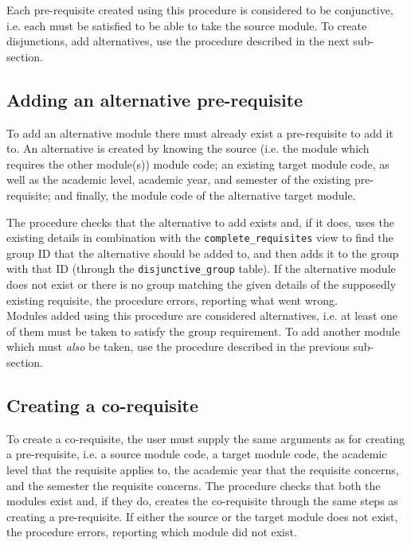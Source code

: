     Each pre-requisite created using this procedure is considered to be
    conjunctive, i.e. each must be satisfied to be able to take the source
    module. To create disjunctions, add alternatives, use the procedure
    described in the next sub-section.
    
    \subsection{Adding an alternative pre-requisite}
    To add an alternative module there must already exist a pre-requisite to add
    it to. An alternative is created by knowing the source (i.e. the module
    which requires the other module(s)) module code; an existing target module
    code, as well as the academic level, academic year, and semester of the
    existing pre-requisite; and finally, the module code of the alternative
    target module.
    
    The procedure checks that the alternative to add exists and, if it does,
    uses the existing details in combination with the
    \texttt{complete\_requisites} view to find the group ID that the alternative
    should be added to, and then adds it to the group with that ID (through the
    \texttt{disjunctive\_group} table). If the alternative module does not exist
    or there is no group matching the given details of the supposedly existing
    requisite, the procedure errors, reporting what went wrong.
    \\
    
    Modules added using this procedure are considered alternatives, i.e. at
    least one of them must be taken to satisfy the group requirement. To add
    another module which must \textit{also} be taken, use the procedure
    described in the previous sub-section.
    
    \subsection{Creating a co-requisite}
    To create a co-requisite, the user must supply the same arguments as for
    creating a pre-requisite, i.e. a source module code, a target module code,
    the academic level that the requisite applies to, the academic year that the
    requisite concerns, and the semester the requisite concerns. The procedure
    checks that both the modules exist and, if they do, creates the co-requisite
    through the same steps as creating a pre-requisite. If either the source or
    the target module does not exist, the procedure errors, reporting which
    module did not exist.
    \\
    
